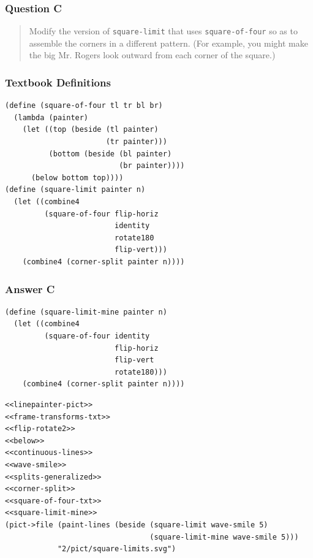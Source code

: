 \documentclass[final,fleqn,titlepage,twoside]{article}
\begin{document}
\subsubsection{Question C}
\label{sec:org35a5164}
\begin{quote}
Modify the version of \texttt{square-limit} that uses \texttt{square-of-four} so as
to assemble the corners in a different pattern.  (For example, you might make
the big Mr. Rogers look outward from each corner of the square.)
\end{quote}

\subsubsection{Textbook Definitions}
\label{sec:org5b7f757}
\begin{verbatim}
(define (square-of-four tl tr bl br)
  (lambda (painter)
    (let ((top (beside (tl painter) 
                       (tr painter)))
          (bottom (beside (bl painter) 
                          (br painter))))
      (below bottom top))))
(define (square-limit painter n)
  (let ((combine4 
         (square-of-four flip-horiz 
                         identity
                         rotate180 
                         flip-vert)))
    (combine4 (corner-split painter n))))
\end{verbatim}

\subsubsection{Answer C}
\label{sec:org3eef080}
\begin{verbatim}
(define (square-limit-mine painter n)
  (let ((combine4 
         (square-of-four identity
                         flip-horiz
                         flip-vert 
                         rotate180)))
    (combine4 (corner-split painter n))))
\end{verbatim}
\begin{verbatim}
<<linepainter-pict>>
<<frame-transforms-txt>>
<<flip-rotate2>>
<<below>>
<<continuous-lines>>
<<wave-smile>>
<<splits-generalized>>
<<corner-split>>
<<square-of-four-txt>>
<<square-limit-mine>>
(pict->file (paint-lines (beside (square-limit wave-smile 5)
                                 (square-limit-mine wave-smile 5)))
            "2/pict/square-limits.svg")
\end{verbatim}
\end{document}
